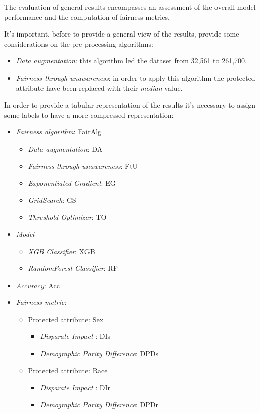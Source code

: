 The evaluation of general results encompasses an assessment of the overall model performance and the computation of fairness metrics.

It's important, before to provide a general view of the results, provide some considerations on the pre-processing algorithms:

\begin{itemize}
    \item \emph{Data augmentation}: this algorithm led the dataset from 32,561 to 261,700.
    \item \emph{Fairness through unawareness}: in order to apply this algorithm the protected attribute have been replaced with their \emph{median} value.
\end{itemize}

In order to provide a tabular representation of the results it's necessary to assign some labels to have a more compressed representation:

\begin{itemize}
    \item \emph{Fairness algorithm}: FairAlg
    \begin{itemize}
        \item \emph{Data augmentation}: DA
        \item \emph{Fairness through unawareness}: FtU
        \item \emph{Exponentiated Gradient}: EG
        \item \emph{GridSearch}: GS
        \item \emph{Threshold Optimizer}: TO
    \end{itemize}
    \item \emph{Model}
    \begin{itemize}
        \item \emph{XGB Classifier}: XGB
        \item \emph{RandomForest Classifier}: RF
    \end{itemize}
    \item \emph{Accuracy}: Acc
    \item \emph{Fairness metric}:
    \begin{itemize}
        \item Protected attribute: Sex
        \begin{itemize}
            \item \emph{Disparate Impact }: DIs
            \item \emph{Demographic Parity Difference}: DPDs
        \end{itemize}
        \item Protected attribute: Race
        \begin{itemize}
            \item \emph{Disparate Impact }: DIr
            \item \emph{Demographic Parity Difference}: DPDr
        \end{itemize}
    \end{itemize}
\end{itemize}

